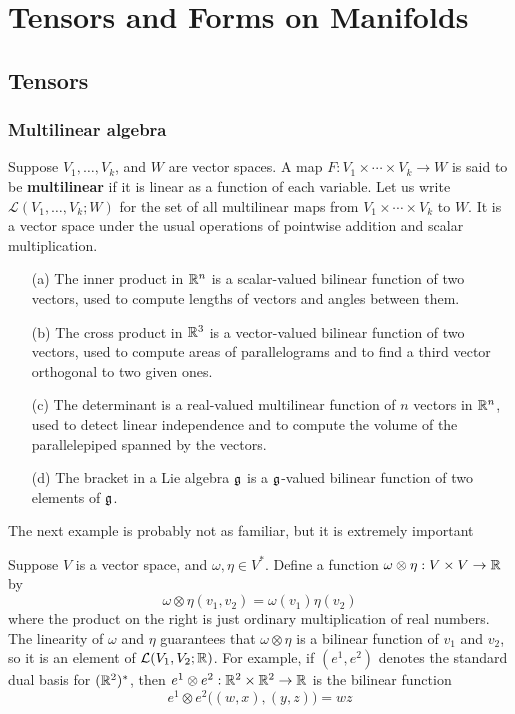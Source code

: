 \chapter{Tensors and Forms on Manifolds}
\section{Tensors}
\subsection{Multilinear algebra}
Suppose $V_1,\dots,V_k$, and $W$ are vector spaces. A map $F:V_1\times\cdots\times V_k\to W$ is said to be \textbf{multilinear} if it is linear as a function of each variable. Let us write $\mathcal{L}(V_1,\dots,V_k;W)$ for the set of all multilinear maps from $V_1\times\cdots\times V_k$ to $W$. It is a vector space under the usual operations of pointwise addition and scalar multiplication.
\begin{example}
\mbox{}
\begin{itemize}
\item[(a)] The inner product in $\mathbb{R}^n$ is a scalar-valued bilinear function of two vectors, used to compute lengths of vectors and angles between them.
\item[(b)] The cross product in $\mathbb{R}^3$ is a vector-valued bilinear function of two vectors, used to compute areas of parallelograms and to find a third vector orthogonal to two given ones.
\item[(c)] The determinant is a real-valued multilinear function of $n$ vectors in $\mathbb{R}^n$, used to detect linear independence and to compute the volume of the parallelepiped spanned by the vectors.
\item[(d)] The bracket in a Lie algebra $\mathfrak{g}$ is a $\mathfrak{g}$-valued bilinear function of two elements of $\mathfrak{g}$.
\end{itemize}
\end{example}
The next example is probably not as familiar, but it is extremely important
\begin{example}
Suppose $V$ is a vector space, and $\omega,\eta\in V^*$. Define a function $\omega\otimes\eta:V\times V\to\mathbb{R}$ by
\[\omega\otimes\eta(v_1,v_2)=\omega(v_1)\eta(v_2)\]
where the product on the right is just ordinary multiplication of real numbers. The linearity of $\omega$ and $\eta$ guarantees that $\omega\otimes\eta$ is a bilinear function of $v_1$ and $v_2$, so it is an element of $\mathcal{L}(V_1,V_2;\mathbb{R})$. For example, if $(e^1,e^2)$ denotes the standard dual basis for $(\mathbb{R}^2)^*$, then $e^1\otimes e^2:\mathbb{R}^2\times\mathbb{R}^2\to\mathbb{R}$ is the bilinear function
\[e^1\otimes e^2\big((w,x),(y,z)\big)=wz\]
\end{example}
